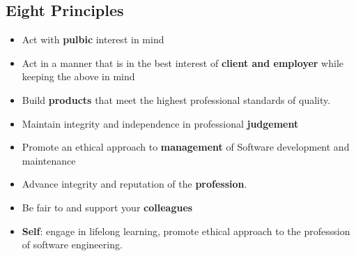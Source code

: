 \documentclass{article}
\begin{document}
\subsection{Eight Principles}
\begin{itemize}
    \item Act with \textbf{pulbic} interest in mind
    
    \item Act in a manner that is in the best interest of \textbf{client and employer} while keeping the above in mind
    
    \item Build \textbf{products} that meet the highest professional standards of quality.
    
    \item Maintain integrity and independence in professional \textbf{judgement}
    
    \item Promote an ethical approach to \textbf{management} of Software development and maintenance
    
    \item Advance integrity and reputation of the \textbf{profession}. 
    
    \item Be fair to and support your \textbf{colleagues}
    
    \item \textbf{Self}: engage in lifelong learning, promote ethical approach to the professsion of software engineering. 
\end{itemize}
\end{document}
